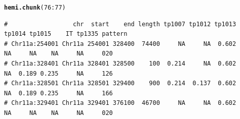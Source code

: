 \documentclass{article}\usepackage[]{graphicx}\usepackage[]{color}
\makeatletter
\newcommand{\hlnum}[1]{\textcolor[rgb]{0.686,0.059,0.569}{#1}}%
\newcommand{\hlopt}[1]{\textcolor[rgb]{0,0,0}{#1}}%
\newcommand{\hlstd}[1]{\textcolor[rgb]{0.345,0.345,0.345}{#1}}%
\newcommand{\hlkwd}[1]{\textcolor[rgb]{0.737,0.353,0.396}{\textbf{#1}}}%
\newenvironment{kframe}{%
 \def\at@end@of@kframe{}%
 \ifinner\ifhmode%
  \def\at@end@of@kframe{\end{minipage}}%
  \begin{minipage}{\columnwidth}%
 \fi\fi%
 \def\FrameCommand##1{\hskip\@totalleftmargin \hskip-\fboxsep
 \colorbox{shadecolor}{##1}\hskip-\fboxsep
     \hskip-\linewidth \hskip-\@totalleftmargin \hskip\columnwidth}%
 \MakeFramed {\advance\hsize-\width
   \@totalleftmargin\z@ \linewidth\hsize
   \@setminipage}}%
 {\par\unskip\endMakeFramed%
 \at@end@of@kframe}
\newenvironment{knitrout}{}{} %
\makeatother
\begin{document}
\begin{knitrout}\footnotesize
{}\color{fgcolor}\begin{kframe}
\begin{alltt}
\hlkwd{hemi.chunk}\hlstd{(}\hlnum{76}\hlopt{:}\hlnum{77}\hlstd{)}
\end{alltt}
\begin{verbatim}
#                  chr  start    end length tp1007 tp1012 tp1013 tp1014 tp1015    IT tp1335 pattern
# Chr11a:254001 Chr11a 254001 328400  74400     NA     NA  0.602     NA     NA    NA     NA     020
# Chr11a:328401 Chr11a 328401 328500    100  0.214     NA  0.602     NA  0.189 0.235     NA     126
# Chr11a:328501 Chr11a 328501 329400    900  0.214  0.137  0.602     NA  0.189 0.235     NA     166
# Chr11a:329401 Chr11a 329401 376100  46700     NA     NA  0.602     NA     NA    NA     NA     020
\end{verbatim}
\end{kframe}


\end{knitrout}
\end{document}
